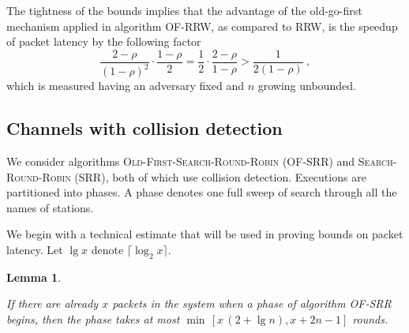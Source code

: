 \documentclass[11pt]{article}
\newtheorem{lemma}{Lemma}
\begin{document}
The tightness of the bounds implies that the advantage of the old-go-first mechanism applied in algorithm \textsc{OF-RRW}, as compared to \textsc{RRW}, is the speedup of packet latency by the following factor 
\[
\frac{2-\rho}{(1-\rho)^2} \cdot  \frac{1-\rho}{2} =\frac{1}{2}\cdot \frac{2-\rho}{1-\rho} > \frac{1}{2(1-\rho)}
\ ,
\] 
which is measured having an adversary fixed and $n$ growing unbounded.





\subsection{Channels with collision detection}



We consider algorithms \textsc{Old-First-Search-Round-Robin} (\textsc{OF-SRR}) and \textsc{Search-Round-Robin} (\textsc{SRR}), both of which use collision detection.
Executions are partitioned into phases.
A  phase denotes one full sweep of search through all the names of stations.

We begin with a technical estimate that will be used in proving bounds on packet latency.
Let $\lg x$ denote $\lceil \log_2 x \rceil$.


\begin{lemma}
\label{lem:phase-OF-SRR}

If there are already $x$ packets in the system when a phase of algorithm \textsc{OF-SRR} begins, then the phase takes at most $\min \,[ x\,(2+\lg n), x+2n-1]$ rounds.
\end{lemma}
\end{document}
